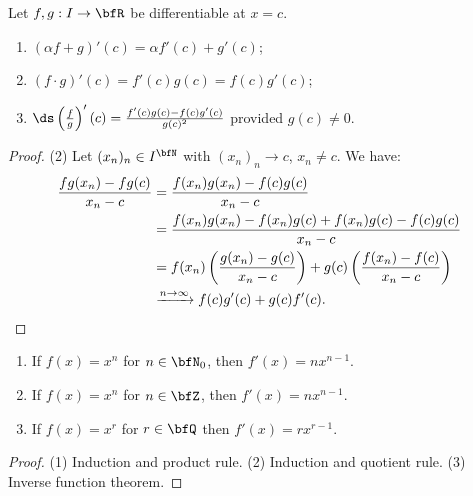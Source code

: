     \begin{theorem}
        Let $f,g:I \rightarrow \bfR$ be differentiable at $x = c$.
            \begin{enumerate}[label = (\arabic*)]
                \item $(\alpha f + g)'(c) = \alpha f'(c) + g'(c)$;
                \item $(f\cdot g)'(c) = f'(c)g(c) = f(c)g'(c)$;
                \item $\ds \left(\frac{f}{g}\right)'(c) = \frac{f'(c)g(c) - f(c)g'(c)}{g(c)^2}$ provided $g(c) \neq 0$.
            \end{enumerate}
    \end{theorem}
        \begin{proof}
            (2) Let $(x_n)_n \in I^\bfN$ with $(x_n)_n \rightarrow c$, $x_n \neq c$. We have:
                \begin{equation*}
                \begin{split}
                    \frac{fg(x_n) - fg(c)}{x_n - c} 
                    &= \frac{f(x_n)g(x_n) - f(c)g(c)}{x_n - c} \\
                    & = \frac{f(x_n)g(x_n)- f(x_n)g(c) + f(x_n)g(c) - f(c)g(c)}{x_n - c} \\
                    & = f(x_n) \left(\frac{g(x_n) - g(c)}{x_n -c}\right) + g(c) \left( \frac{f(x_n) - f(c)}{x_n - c}\right) \\
                    & \xrightarrow{n \rightarrow \infty} f(c)g'(c) + g(c)f'(c). \qedhere
                \end{split}
                \end{equation*}
        \end{proof}

    \begin{proposition}
        \phantom{a}
        \begin{enumerate}[label = (\arabic*)]
            \item If $f(x) = x^n$ for $n \in \bfN_0$, then $f'(x) = nx^{n-1}$.
            \item If $f(x) = x^n$ for $n \in \bfZ$, then $f'(x) = nx^{n-1}$.
            \item If $f(x) = x^r$ for $r \in \bfQ$ then $f'(x) = rx^{r-1}$.
        \end{enumerate}
    \end{proposition}
        \begin{proof}
            (1) Induction and product rule. (2) Induction and quotient rule. (3) Inverse function theorem.
        \end{proof}

